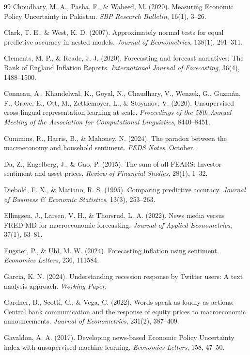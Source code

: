 \documentclass[11pt,twocolumn]{article}
\begin{document}
\begin{thebibliography}{99}
 Choudhary, M. A., Pasha, F., \& Waheed, M. (2020). Measuring Economic Policy Uncertainty in Pakistan. \textit{SBP Research Bulletin}, 16(1), 3--26.

 Clark, T. E., \& West, K. D. (2007). Approximately normal tests for equal predictive accuracy in nested models. \textit{Journal of Econometrics}, 138(1), 291--311.

 Clements, M. P., \& Reade, J. J. (2020). Forecasting and forecast narratives: The Bank of England Inflation Reports. \textit{International Journal of Forecasting}, 36(4), 1488--1500.

 Conneau, A., Khandelwal, K., Goyal, N., Chaudhary, V., Wenzek, G., Guzm\'an, F., Grave, E., Ott, M., Zettlemoyer, L., \& Stoyanov, V. (2020). Unsupervised cross-lingual representation learning at scale. \textit{Proceedings of the 58th Annual Meeting of the Association for Computational Linguistics}, 8440--8451.

 Cummins, R., Harris, B., \& Mahoney, N. (2024). The paradox between the macroeconomy and household sentiment. \textit{FEDS Notes}, October.

 Da, Z., Engelberg, J., \& Gao, P. (2015). The sum of all FEARS: Investor sentiment and asset prices. \textit{Review of Financial Studies}, 28(1), 1--32.

 Diebold, F. X., \& Mariano, R. S. (1995). Comparing predictive accuracy. \textit{Journal of Business \& Economic Statistics}, 13(3), 253--263.

 Ellingsen, J., Larsen, V. H., \& Thorsrud, L. A. (2022). News media versus FRED-MD for macroeconomic forecasting. \textit{Journal of Applied Econometrics}, 37(1), 63--81.

 Eugster, P., \& Uhl, M. W. (2024). Forecasting inflation using sentiment. \textit{Economics Letters}, 236, 111584.

 Garcia, K. N. (2024). Understanding recession response by Twitter users: A text analysis approach. \textit{Working Paper}.

 Gardner, B., Scotti, C., \& Vega, C. (2022). Words speak as loudly as actions: Central bank communication and the response of equity prices to macroeconomic announcements. \textit{Journal of Econometrics}, 231(2), 387--409.

 Gavaldon, A. A. (2017). Developing news-based Economic Policy Uncertainty index with unsupervised machine learning. \textit{Economics Letters}, 158, 47--50.


\end{thebibliography}
\end{document}
